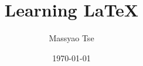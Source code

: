 \documentclass{article}
\begin{document}
\author{Massyao Tse}
\title{Learning \LaTeX{}}
\date{\today{}} %


\maketitle{} %
\newpage

\tableofcontents{} %

































  \maketitle
  \newpage



  \newpage
  \begin{appendix}
    \listoffigures
    \listoftables
  \end{appendix}
\end{document}
